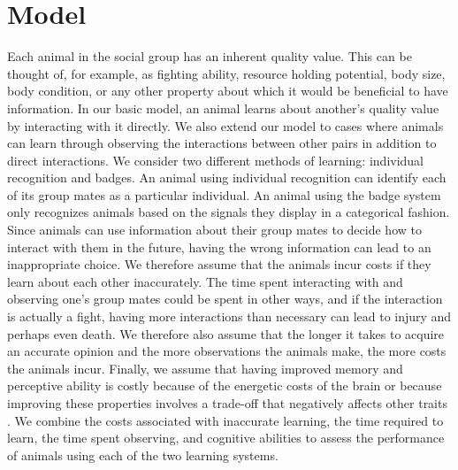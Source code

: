 \section*{Model} 
Each animal in the social group has an inherent quality value. This can be thought of, for example, as fighting ability, resource holding potential, body size, body condition, or any other property about which it would be beneficial to have information. In our basic model, an animal learns about another's quality value by interacting with it directly. We also extend our model to cases where animals can learn through observing the interactions between other pairs in addition to direct interactions. We consider two different methods of learning: individual recognition and badges. An animal using individual recognition can identify each of its group mates as a particular individual. An animal using the badge system only recognizes animals based on the signals they display in a categorical fashion. Since animals can use information about their group mates to decide how to interact with them in the future, having the wrong information can lead to an inappropriate choice. We therefore assume that the animals incur costs if they learn about each other inaccurately. The time spent interacting with and observing one's group mates could be spent in other ways, and if the interaction is actually a fight, having more interactions than necessary can lead to injury and perhaps even death.  We therefore also assume that the longer it takes to acquire an accurate opinion and the more observations the animals make, the more costs the animals incur. Finally, we assume that having improved memory and perceptive ability is costly because of the energetic costs of the brain \cite{Laughlin:2001qf,Laughlin:1998ly,Dunbar:1992ys} or because improving these properties involves a trade-off that negatively affects other traits \cite{MacIver:2010ve}. We combine the costs associated with inaccurate learning, the time required to learn, the time spent observing, and cognitive abilities to assess the performance of animals using each of the two learning systems. 

